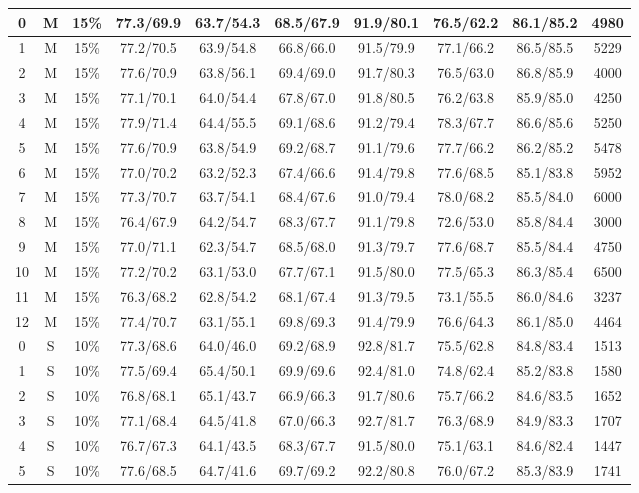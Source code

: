 \begin{table*}
{\begin{tabular}{|c|c|c||c|c|c|c|c|c||c|}
0 & M & 15\% & 77.3/69.9 & 63.7/54.3 & 68.5/67.9 & 91.9/80.1 & 76.5/62.2 & 86.1/85.2 & 4980 \\ \hline
1 & M & 15\% & 77.2/70.5 & 63.9/54.8 & 66.8/66.0 & 91.5/79.9 & 77.1/66.2 & 86.5/85.5 & 5229 \\ \hline
2 & M & 15\% & 77.6/70.9 & 63.8/56.1 & 69.4/69.0 & 91.7/80.3 & 76.5/63.0 & 86.8/85.9 & 4000 \\ \hline
3 & M & 15\% & 77.1/70.1 & 64.0/54.4 & 67.8/67.0 & 91.8/80.5 & 76.2/63.8 & 85.9/85.0 & 4250 \\ \hline
4 & M & 15\% & 77.9/71.4 & 64.4/55.5 & 69.1/68.6 & 91.2/79.4 & 78.3/67.7 & 86.6/85.6 & 5250 \\ \hline
5 & M & 15\% & 77.6/70.9 & 63.8/54.9 & 69.2/68.7 & 91.1/79.6 & 77.7/66.2 & 86.2/85.2 & 5478 \\ \hline
6 & M & 15\% & 77.0/70.2 & 63.2/52.3 & 67.4/66.6 & 91.4/79.8 & 77.6/68.5 & 85.1/83.8 & 5952 \\ \hline
7 & M & 15\% & 77.3/70.7 & 63.7/54.1 & 68.4/67.6 & 91.0/79.4 & 78.0/68.2 & 85.5/84.0 & 6000 \\ \hline
8 & M & 15\% & 76.4/67.9 & 64.2/54.7 & 68.3/67.7 & 91.1/79.8 & 72.6/53.0 & 85.8/84.4 & 3000 \\ \hline
9 & M & 15\% & 77.0/71.1 & 62.3/54.7 & 68.5/68.0 & 91.3/79.7 & 77.6/68.7 & 85.5/84.4 & 4750 \\ \hline
10 & M & 15\% & 77.2/70.2 & 63.1/53.0 & 67.7/67.1 & 91.5/80.0 & 77.5/65.3 & 86.3/85.4 & 6500 \\ \hline
11 & M & 15\% & 76.3/68.2 & 62.8/54.2 & 68.1/67.4 & 91.3/79.5 & 73.1/55.5 & 86.0/84.6 & 3237 \\ \hline
12 & M & 15\% & 77.4/70.7 & 63.1/55.1 & 69.8/69.3 & 91.4/79.9 & 76.6/64.3 & 86.1/85.0 & 4464 \\ \hline
0 & S & 10\% & 77.3/68.6 & 64.0/46.0 & 69.2/68.9 & 92.8/81.7 & 75.5/62.8 & 84.8/83.4 & 1513 \\ \hline
1 & S & 10\% & 77.5/69.4 & 65.4/50.1 & 69.9/69.6 & 92.4/81.0 & 74.8/62.4 & 85.2/83.8 & 1580 \\ \hline
2 & S & 10\% & 76.8/68.1 & 65.1/43.7 & 66.9/66.3 & 91.7/80.6 & 75.7/66.2 & 84.6/83.5 & 1652 \\ \hline
3 & S & 10\% & 77.1/68.4 & 64.5/41.8 & 67.0/66.3 & 92.7/81.7 & 76.3/68.9 & 84.9/83.3 & 1707 \\ \hline
4 & S & 10\% & 76.7/67.3 & 64.1/43.5 & 68.3/67.7 & 91.5/80.0 & 75.1/63.1 & 84.6/82.4 & 1447 \\ \hline
5 & S & 10\% & 77.6/68.5 & 64.7/41.6 & 69.7/69.2 & 92.2/80.8 & 76.0/67.2 & 85.3/83.9 & 1741 \\ \hline

\end{tabular}}
\end{table*}
